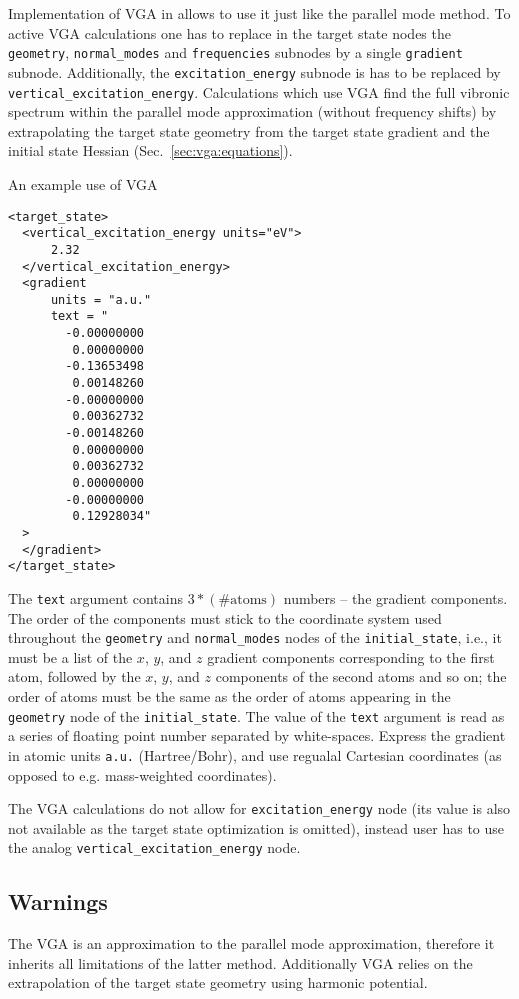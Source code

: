 \documentclass[11pt]{article}
\begin{document}
Implementation of VGA in \ezFCF{} allows to use it just like the parallel 
mode method. To active VGA calculations one has to replace in the target 
state nodes the \texttt{geometry}, \texttt{normal\_modes} and 
\texttt{frequencies} subnodes by a single \texttt{gradient} subnode. 
Additionally, the \texttt{excitation\_energy} subnode is has to be replaced 
by \texttt{vertical\_excitation\_energy}.
Calculations which use VGA find the full vibronic spectrum within the 
parallel mode approximation (without frequency shifts) by extrapolating
the target state geometry from the target state gradient and the initial 
state Hessian (Sec.~\ref{sec:vga:equations}).

An example use of VGA
\begin{lstlisting}[frame=single,framerule=0pt]
<target_state>
  <vertical_excitation_energy units="eV"> 
      2.32 
  </vertical_excitation_energy>
  <gradient
      units = "a.u."
      text = "
        -0.00000000
         0.00000000
        -0.13653498
         0.00148260
        -0.00000000
         0.00362732
        -0.00148260
         0.00000000
         0.00362732
         0.00000000
        -0.00000000
         0.12928034"
  >
  </gradient>
</target_state>
\end{lstlisting}
The \texttt{text} argument contains $3*(\textrm{\# atoms})$ numbers -- the 
gradient components. The order of the components must stick to the coordinate 
system used throughout the \texttt{geometry} and \texttt{normal\_modes} nodes 
of the \texttt{initial\_state}, i.e., it must be a list of the $x$, $y$, and 
$z$ gradient components corresponding to the first atom, followed by the $x$, 
$y$, and $z$ components of the second atoms and so on; the order of atoms must 
be the same as the order of atoms appearing in the \texttt{geometry} node of 
the \texttt{initial\_state}. The value of the \texttt{text} argument is read as 
a series of floating point number separated by white-spaces. Express the 
gradient in atomic units \texttt{a.u.} (Hartree/Bohr), and use regualal 
Cartesian coordinates (as opposed to e.g. mass-weighted coordinates).

The VGA calculations do not allow for \texttt{excitation\_energy} node (its 
value is also not available as the target state optimization is omitted), 
instead user has to use the analog \texttt{vertical\_excitation\_energy} 
node.

\subsection{Warnings}
\label{sec:vga:warnings}
The VGA is an approximation to the parallel mode approximation, therefore it 
inherits all limitations of the latter method. Additionally VGA relies on the 
extrapolation of the target state geometry using harmonic potential.
\end{document}
